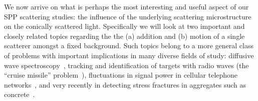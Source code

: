 We now arrive on what is perhaps the most interesting and useful aspect of
our SPP scattering studies: the influence of the underlying scattering
microstructure on the conically scattered light.  Specifically we will look
at two important and closely related topics regarding the the (a) addition
and (b) motion of a single scatterer amongst a fixed background.  Such
topics belong to a more general class of problems with important
implications in many diverse fields of study: diffusive wave
spectroscopy~\cite{pine1988diffusing}, tracking and identification of
targets with radio waves (the ``cruise missile''
problem~\cite{atkins1991neural}), fluctuations in signal power in cellular
telephone networks~\cite{abdi2001estimation}, and very recently in
detecting stress fractures in aggregates such as
concrete~\cite{larose2010locating}.
